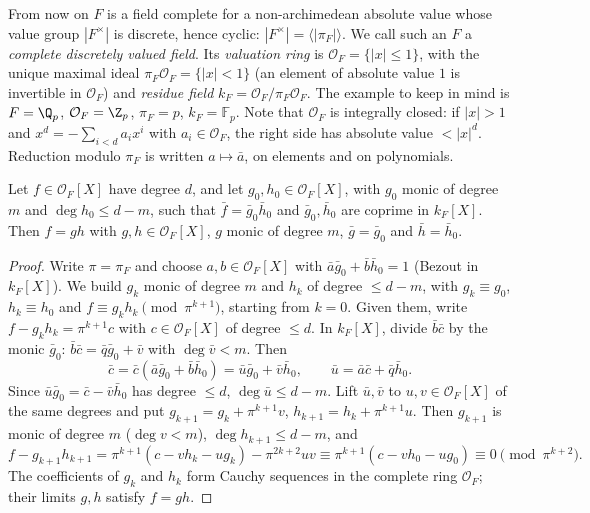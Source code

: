 From now on $F$ is a field complete for a non-archimedean absolute value whose value group $|F^\times|$ is discrete, hence
cyclic: $|F^\times|=\langle|\pi_F|\rangle$. We call such an $F$ a \emph{complete discretely valued field}. Its
\emph{valuation ring} is $\mathcal O_F=\{|x|\le1\}$, with the unique maximal ideal $\pi_F\mathcal O_F=\{|x|<1\}$ (an element of
absolute value $1$ is invertible in $\mathcal O_F$) and \emph{residue field} $k_F=\mathcal O_F/\pi_F\mathcal O_F$. The example to
keep in mind is $F=\Q_p$, $\mathcal O_F=\Z_p$, $\pi_F=p$, $k_F=\mathbb F_p$. Note that $\mathcal O_F$ is integrally closed: if
$|x|>1$ and $x^d=-\sum_{i<d}a_ix^i$ with $a_i\in\mathcal O_F$, the right side has absolute value $<|x|^d$. Reduction modulo
$\pi_F$ is written $a\mapsto\bar a$, on elements and on polynomials.

\begin{theorem}\label{thm:henselfact}
Let $f\in\mathcal O_F[X]$ have degree $d$, and let $g_0,h_0\in\mathcal O_F[X]$, with $g_0$ monic of degree $m$ and $\deg h_0\le
d-m$, such that $\bar f=\bar g_0\bar h_0$ and $\bar g_0,\bar h_0$ are coprime in $k_F[X]$. Then $f=gh$ with $g,h\in\mathcal
O_F[X]$, $g$ monic of degree $m$, $\bar g=\bar g_0$ and $\bar h=\bar h_0$.
\end{theorem}
\begin{proof}
Write $\pi=\pi_F$ and choose $a,b\in\mathcal O_F[X]$ with $\bar a\bar g_0+\bar b\bar h_0=1$ (Bezout in $k_F[X]$). We build
$g_k$ monic of degree $m$ and $h_k$ of degree $\le d-m$, with $g_k\equiv g_0$, $h_k\equiv h_0$ and $f\equiv g_kh_k\pmod{\pi^{k+1}}$,
starting from $k=0$. Given them, write $f-g_kh_k=\pi^{k+1}c$ with $c\in\mathcal O_F[X]$ of degree $\le d$. In $k_F[X]$, divide
$\bar b\bar c$ by the monic $\bar g_0$: $\bar b\bar c=\bar q\bar g_0+\bar v$ with $\deg\bar v<m$. Then
\[
\bar c=\bar c(\bar a\bar g_0+\bar b\bar h_0)=\bar u\bar g_0+\bar v\bar h_0,\qquad\bar u=\bar a\bar c+\bar q\bar h_0.
\]
Since $\bar u\bar g_0=\bar c-\bar v\bar h_0$ has degree $\le d$, $\deg\bar u\le d-m$. Lift $\bar u,\bar v$ to $u,v\in\mathcal
O_F[X]$ of the same degrees and put $g_{k+1}=g_k+\pi^{k+1}v$, $h_{k+1}=h_k+\pi^{k+1}u$. Then $g_{k+1}$ is monic of degree $m$
($\deg v<m$), $\deg h_{k+1}\le d-m$, and
\[
f-g_{k+1}h_{k+1}=\pi^{k+1}(c-vh_k-ug_k)-\pi^{2k+2}uv\equiv\pi^{k+1}(c-vh_0-ug_0)\equiv0\pmod{\pi^{k+2}}.
\]
The coefficients of $g_k$ and $h_k$ form Cauchy sequences in the complete ring $\mathcal O_F$; their limits $g,h$ satisfy $f=gh$.
\end{proof}

